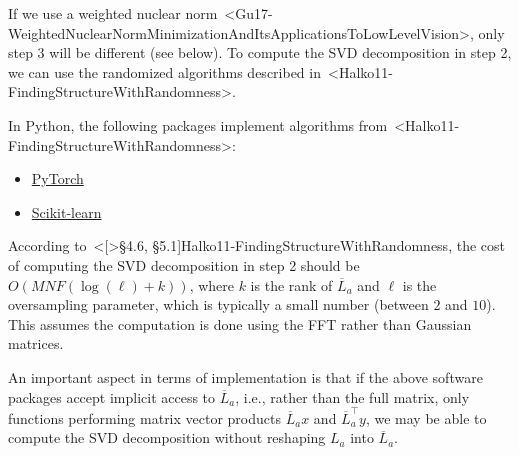 \documentclass[a4paper,11pt]{article}
\def\cite#1{<#1>}%
\begin{document}
If we use a weighted nuclear
norm~\cite{Gu17-WeightedNuclearNormMinimizationAndItsApplicationsToLowLevelVision},
only step 3 will be different (see below). To compute the SVD decomposition in
step 2, we can use the randomized algorithms described
in~\cite{Halko11-FindingStructureWithRandomness}.

In Python, the following packages implement algorithms
from~\cite{Halko11-FindingStructureWithRandomness}:
\begin{itemize}
  \item \href{https://docs.pytorch.org/docs/stable/generated/torch.svd_lowrank.html}{PyTorch}

  \item \href{https://scikit-learn.org/stable/modules/generated/sklearn.utils.extmath.randomized_svd.html#rf38c2b656ebc-1}{Scikit-learn}
\end{itemize}
According to~\cite[\S4.6, \S5.1]{Halko11-FindingStructureWithRandomness}, the
cost of computing the SVD decomposition in step 2 should be $O(MNF(\log(\ell) +
k))$, where $k$ is the rank of $\overline{L}_a$ and $\ell$ is the oversampling parameter,
which is typically a small number (between $2$ and $10$).
This assumes the computation is done using the FFT rather than Gaussian
matrices.

\begin{Remark}
An important aspect in terms of implementation is that if the above software
packages accept implicit access to $\overline{L}_a$, i.e., rather than the full
matrix, only functions performing matrix vector products $\overline{L}_a x$ and
$\overline{L}_a ^\top y$, we may be able to compute the SVD decomposition
without reshaping $L_a$ into $\overline{L}_a$.
\end{Remark}
\end{document}
